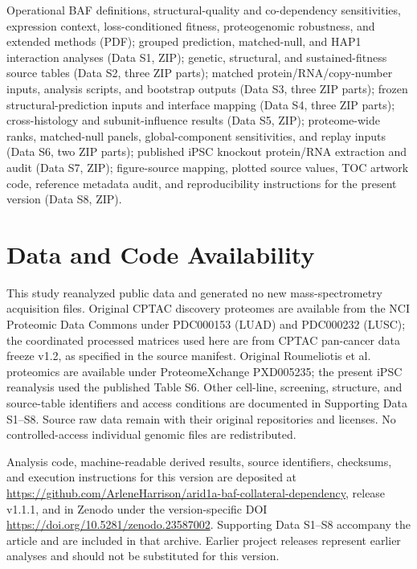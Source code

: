 \documentclass[journal=jprobs,manuscript=article,layout=traditional]{achemso}
\begin{document}
\begin{suppinfo}
Operational BAF definitions, structural-quality and co-dependency sensitivities, expression context, loss-conditioned fitness, proteogenomic robustness, and extended methods (PDF); grouped prediction, matched-null, and HAP1 interaction analyses (Data S1, ZIP); genetic, structural, and sustained-fitness source tables (Data S2, three ZIP parts); matched protein/RNA/copy-number inputs, analysis scripts, and bootstrap outputs (Data S3, three ZIP parts); frozen structural-prediction inputs and interface mapping (Data S4, three ZIP parts); cross-histology and subunit-influence results (Data S5, ZIP); proteome-wide ranks, matched-null panels, global-component sensitivities, and replay inputs (Data S6, two ZIP parts); published iPSC knockout protein/RNA extraction and audit (Data S7, ZIP); figure-source mapping, plotted source values, TOC artwork code, reference metadata audit, and reproducibility instructions for the present version (Data S8, ZIP).
\end{suppinfo}

\section*{Data and Code Availability}
This study reanalyzed public data and generated no new mass-spectrometry acquisition files. Original CPTAC discovery proteomes are available from the NCI Proteomic Data Commons under PDC000153 (LUAD) and PDC000232 (LUSC); the coordinated processed matrices used here are from CPTAC pan-cancer data freeze v1.2, as specified in the source manifest. Original Roumeliotis et al. proteomics are available under ProteomeXchange PXD005235; the present iPSC reanalysis used the published Table S6. Other cell-line, screening, structure, and source-table identifiers and access conditions are documented in Supporting Data S1--S8. Source raw data remain with their original repositories and licenses. No controlled-access individual genomic files are redistributed.

Analysis code, machine-readable derived results, source identifiers, checksums, and execution instructions for this version are deposited at \url{https://github.com/ArleneHarrison/arid1a-baf-collateral-dependency}, release v1.1.1, and in Zenodo under the version-specific DOI \url{https://doi.org/10.5281/zenodo.23587002}.\citep{projectcode,projectarchive} Supporting Data S1--S8 accompany the article and are included in that archive. Earlier project releases represent earlier analyses and should not be substituted for this version.
\end{document}
